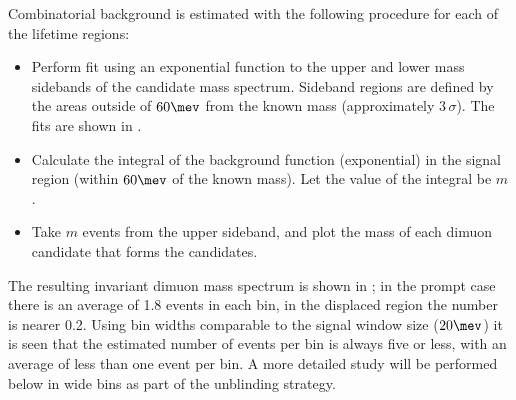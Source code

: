Combinatorial background
is estimated with the following procedure for each of the lifetime regions:
\begin{itemize}
  \item Perform fit using an exponential function to the upper and lower mass sidebands of the \Bd
    candidate mass spectrum.  Sideband regions are defined by the areas outside of $60\mev$ from
    the known \Bd mass (approximately $3\,\sigma$).
    The fits are shown in .
  \item Calculate the integral of the background function (exponential) in the signal region
    (within $60\mev$ of the known \Bd mass).
    Let the value of the integral be $m$.
  \item Take $m$ events from the upper sideband, and plot the mass of each dimuon candidate that
    forms the \Bd candidates.
\end{itemize}
The resulting invariant dimuon mass spectrum is shown in ; in the prompt case
there is an average of 1.8 events in each bin, in the displaced region the number is nearer 0.2.
Using bin widths comparable to the signal window size ($20\mev$) it is seen that the estimated
number of events per bin is always five or less, with an average of less than one event per bin.
A more detailed study will be performed below in wide bins as part of the unblinding strategy.











